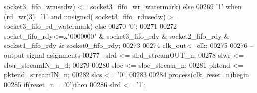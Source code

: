 \begin{DoxyCode}
{      socket3_fifo_wrusedw}\textcolor{vhdlchar}{)} \textcolor{vhdlchar}{<=} \textcolor{vhdlchar}{socket3_fifo_wr_watermark}\textcolor{vhdlchar}{)} \textcolor{keywordflow}{else}
00269                                         \textcolor{vhdlchar}{'}\textcolor{vhdllogic}{}\textcolor{vhdllogic}{1}\textcolor{vhdlchar}{'} \textcolor{keywordflow}{when} \textcolor{vhdlchar}{(}\textcolor{vhdlchar}{rd_wr}\textcolor{vhdlchar}{(}\textcolor{vhdllogic}{}\textcolor{vhdllogic}{3}\textcolor{vhdlchar}{)}\textcolor{vhdlchar}{=}\textcolor{vhdlchar}{'}\textcolor{vhdllogic}{}\textcolor{vhdllogic}{1}\textcolor{vhdlchar}{'} \textcolor{keywordflow}{and} \textcolor{comment}{unsigned}\textcolor{vhdlchar}{(}\textcolor{vhdlchar}{
      socket3_fifo_rdusedw}\textcolor{vhdlchar}{)} \textcolor{vhdlchar}{>=} \textcolor{vhdlchar}{socket3_fifo_rd_watermark}\textcolor{vhdlchar}{)} \textcolor{keywordflow}{else} 
00270                                         \textcolor{vhdlchar}{'}\textcolor{vhdllogic}{}\textcolor{vhdllogic}{0}\textcolor{vhdlchar}{'};
00271 
00272 \textcolor{vhdlchar}{socket_fifo_rdy}\textcolor{vhdlchar}{<=}\textcolor{vhdlchar}{x}\textcolor{vhdllogic}{"0000000"} \textcolor{vhdlchar}{&} \textcolor{vhdlchar}{socket3_fifo_rdy} \textcolor{vhdlchar}{&} \textcolor{vhdlchar}{socket2_fifo_rdy} \textcolor{vhdlchar}{&} \textcolor{vhdlchar}{
      socket1_fifo_rdy} \textcolor{vhdlchar}{&} \textcolor{vhdlchar}{socket0_fifo_rdy}; 
00273 
00274 \textcolor{vhdlchar}{clk_out}\textcolor{vhdlchar}{<=}\textcolor{vhdlchar}{clk};
00275   
00276 \textcolor{keyword}{--output signal asignments}
00277 \textcolor{keyword}{--slrd   <= slrd\_streamOUT\_n;}
00278 \textcolor{vhdlchar}{slwr}   \textcolor{vhdlchar}{<=} \textcolor{vhdlchar}{slwr_streamIN_n_d};   
00279 
00280 \textcolor{vhdlchar}{sloe}   \textcolor{vhdlchar}{<=} \textcolor{vhdlchar}{sloe_stream_n};
00281 \textcolor{vhdlchar}{pktend} \textcolor{vhdlchar}{<=} \textcolor{vhdlchar}{pktend_streamIN_n};
00282 \textcolor{vhdlchar}{slcs}   \textcolor{vhdlchar}{<=} \textcolor{vhdlchar}{'}\textcolor{vhdllogic}{}\textcolor{vhdllogic}{0}\textcolor{vhdlchar}{'};
00283 
00284 \textcolor{keywordflow}{process}(clk, reset_n)\textcolor{keywordflow}{begin}
00285     \textcolor{keywordflow}{if}\textcolor{vhdlchar}{(}\textcolor{vhdlchar}{reset_n} \textcolor{vhdlchar}{=} \textcolor{vhdlchar}{'}\textcolor{vhdllogic}{}\textcolor{vhdllogic}{0}\textcolor{vhdlchar}{'}\textcolor{vhdlchar}{)}\textcolor{keywordflow}{then} 
00286       \textcolor{vhdlchar}{slrd} \textcolor{vhdlchar}{<=} \textcolor{vhdlchar}{'}\textcolor{vhdllogic}{}\textcolor{vhdllogic}{1}\textcolor{vhdlchar}{'};

\end{DoxyCode}
